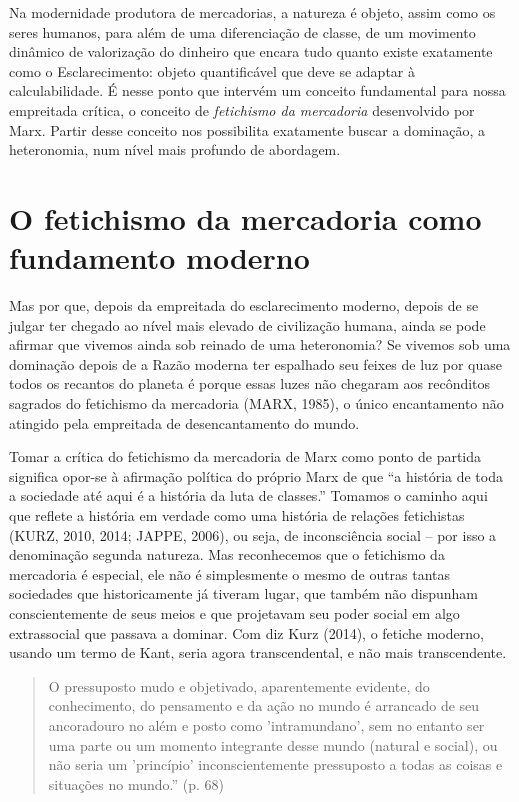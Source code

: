 Na modernidade produtora de mercadorias, a natureza é objeto, assim como
os seres humanos, para além de uma diferenciação de classe, de um
movimento dinâmico de valorização do dinheiro que encara tudo quanto
existe exatamente como o Esclarecimento: objeto quantificável que deve
se adaptar à calculabilidade. É nesse ponto que intervém um conceito
fundamental para nossa empreitada crítica, o conceito de
\emph{fetichismo da mercadoria} desenvolvido por Marx. Partir desse
conceito nos possibilita exatamente buscar a dominação, a heteronomia,
num nível mais profundo de abordagem.

\section{O fetichismo da mercadoria como fundamento moderno}

Mas por que, depois da empreitada do esclarecimento moderno, depois de
se julgar ter chegado ao nível mais elevado de civilização humana, ainda
se pode afirmar que vivemos ainda sob reinado de uma heteronomia? Se
vivemos sob uma dominação depois de a Razão moderna ter espalhado seu
feixes de luz por quase todos os recantos do planeta é porque essas
luzes não chegaram aos recônditos sagrados do fetichismo da mercadoria
(MARX, 1985), o único encantamento não atingido pela empreitada de
desencantamento do mundo.

Tomar a crítica do fetichismo da mercadoria de Marx como ponto de
partida significa opor-se à afirmação política do próprio Marx de que
``a história de toda a sociedade até aqui é a história da luta de
classes.'' Tomamos o caminho aqui que reflete a história em verdade como
uma história de relações fetichistas (KURZ, 2010, 2014; JAPPE, 2006), ou
seja, de inconsciência social -- por isso a denominação segunda
natureza. Mas reconhecemos que o fetichismo da mercadoria é especial,
ele não é simplesmente o mesmo de outras tantas sociedades que
historicamente já tiveram lugar, que também não dispunham
conscientemente de seus meios e que projetavam seu poder social em algo
extrassocial que passava a dominar. Com diz Kurz (2014), o fetiche
moderno, usando um termo de Kant, seria agora transcendental, e não mais
transcendente.

\begin{quote}
O pressuposto mudo e objetivado, aparentemente evidente, do
conhecimento, do pensamento e da ação no mundo é arrancado de seu
ancoradouro no além e posto como 'intramundano', sem no entanto ser uma
parte ou um momento integrante desse mundo (natural e social), ou não
seria um 'princípio' inconscientemente pressuposto a todas as coisas e
situações no mundo.'' (p. 68)
\end{quote}

